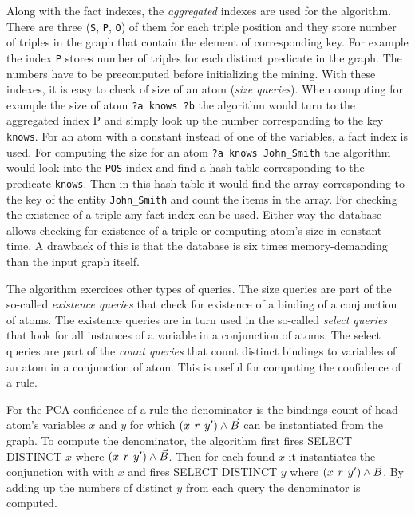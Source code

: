 Along with the fact indexes, the \textit{aggregated} indexes are used for the algorithm. There are three (\verb|S|, \verb|P|, \verb|O|) of them for each triple position and they store number of triples in the graph that contain the element of corresponding key. For example the index \verb|P| stores number of triples for each distinct predicate in the graph. The numbers have to be precomputed before initializing the mining. With these indexes, it is easy to check of size of an atom (\textit{size queries}). When computing for example the size of atom \verb|?a knows ?b| the algorithm would turn to the aggregated index P and simply look up the number corresponding to the key \verb|knows|. For an atom with a constant instead of one of the variables, a fact index is used. For computing the size for an atom \verb|?a knows John_Smith| the algorithm would look into the \verb|POS| index and find a hash table corresponding to the predicate \verb|knows|. Then in this hash table it would find the array corresponding to the key of the entity \verb|John_Smith| and count the items in the array. For checking the existence of a triple any fact index can be used. Either way the database allows checking for existence of a triple or computing atom's size in constant time. A drawback of this is that the database is six times memory-demanding than the input graph itself.

The algorithm exercices other types of queries. The size queries are part of the so-called \textit{existence queries} that check for existence of a binding of a conjunction of atoms. The existence queries are in turn used in the so-called \textit{select queries} that look for all instances of a variable in a conjunction of atoms. The select queries are part of the \textit{count queries} that count distinct bindings to variables of an atom in a conjunction of atom. This is useful for computing the confidence of a rule. 

For the PCA confidence of a rule the denominator is the bindings count of head atom's variables $x$ and $y$ for which $(x\hspace{0.4em}r\hspace{0.4em}y') \land \vec{B}$ can be instantiated from the graph. To compute the denominator, the algorithm first fires SELECT DISTINCT $x$ where $(x\hspace{0.4em}r\hspace{0.4em}y') \land \vec{B}$. Then for each found $x$ it instantiates the conjunction with with $x$ and fires SELECT DISTINCT $y$ where $(x\hspace{0.4em}r\hspace{0.4em}y') \land \vec{B}$. By adding up the numbers of distinct $y$ from each query the denominator is computed.

